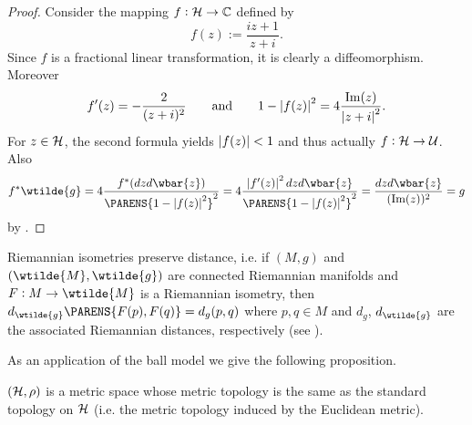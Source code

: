 \begin{proof}
	Consider the mapping $f : \mathcal{H} \to \mathbb{C}$ defined by 
	\begin{equation}
		f(z) := \frac{iz + 1}{z + i}.
	\end{equation}
	Since $f$ is a fractional linear transformation, it is clearly a diffeomorphism. Moreover
	\begin{equation*}
		f'(z) = -\frac{2}{(z + i)^2} \qquad \text{and} \qquad 1 - \abs[0]{f(z)}^2 = 4\frac{\Im(z)}{\abs[0]{z + i}^2}.	
	\end{equation*}
	For $z \in \mathcal{H}$, the second formula yields $\abs[0]{f(z)} < 1$ and thus actually $f : \mathcal{H} \to \mathcal{U}$. Also
	\begin{equation*}
		f^*\wtilde{g} = 4 \frac{f^*(dzd\wbar{z})}{\PARENS{1 - \abs[0]{f(z)}^2}^2} = 4 \frac{\abs[0]{f'(z)}^2dzd\wbar{z}}{\PARENS{1 - \abs[0]{f(z)}^2}^2} = \frac{dzd\wbar{z}}{(\Im(z))^2} = g
	\end{equation*}
	\noindent by \cite[41]{lee:Riemannian_manifolds:1997}.
\end{proof}

\begin{remark}
	Riemannian isometries preserve distance, i.e. if $(M,g)$ and $(\wtilde{M},\wtilde{g})$ are connected Riemannian manifolds and $F : M \to \wtilde{M}$ is a Riemannian isometry, then $d_{\wtilde{g}}\PARENS{F(p),F(q)} = d_g(p,q)$ where $p,q \in M$ and $d_g$, $d_{\wtilde{g}}$ are the associated Riemannian distances, respectively (see \cite[338]{lee:smooth_manifolds:2013}).
\end{remark}

As an application of the ball model we give the following proposition.

\begin{proposition}
$(\mathcal{H},\rho)$ is a metric space whose metric topology is the same as the standard topology on $\mathcal{H}$ (i.e. the metric topology induced by the Euclidean metric).
\label{prop:metric}
\end{proposition}

